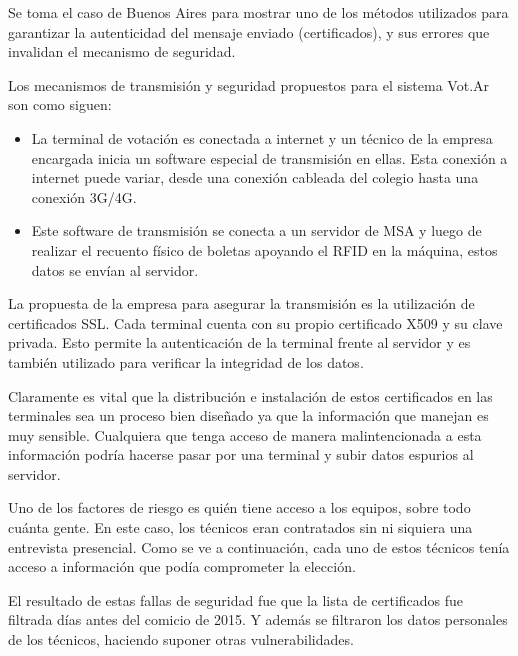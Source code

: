 Se toma el caso de Buenos Aires para mostrar uno de los métodos utilizados para garantizar la autenticidad del mensaje enviado (certificados), y sus errores que invalidan el mecanismo de seguridad.

Los mecanismos de transmisión y seguridad propuestos para el sistema Vot.Ar son como siguen\cite{votar}:
\begin{itemize}
	\item La terminal de votación es conectada a internet y un técnico de la empresa encargada inicia un software especial de transmisión en ellas. Esta conexión a internet puede variar, desde una conexión cableada del colegio hasta una conexión 3G/4G.
	\item Este software de transmisión se conecta a un servidor de MSA y luego de realizar el recuento físico de boletas apoyando el RFID en la máquina, estos datos se envían al servidor.
\end{itemize}

La propuesta de la empresa para asegurar la transmisión es la utilización de certificados SSL. Cada terminal cuenta con su propio certificado X509 y su clave privada. Esto permite la autenticación de la terminal frente al servidor y es también utilizado para verificar la integridad de los datos.

Claramente es vital que la distribución e instalación de estos certificados en las terminales sea un proceso bien diseñado ya que la información que manejan es muy sensible. Cualquiera que tenga acceso de manera malintencionada a esta información podría hacerse pasar por una terminal y subir datos espurios al servidor.

Uno de los factores de riesgo es quién tiene acceso a los equipos, sobre todo cuánta gente. En este caso, los técnicos eran contratados sin ni siquiera una entrevista presencial. Como se ve a continuación, cada uno de estos técnicos tenía acceso a información que podía comprometer la elección\cite{smaldone}.

El resultado de estas fallas de seguridad fue que la lista de certificados fue filtrada días antes del comicio de 2015. Y además se filtraron los datos personales de los técnicos, haciendo suponer otras vulnerabilidades.

